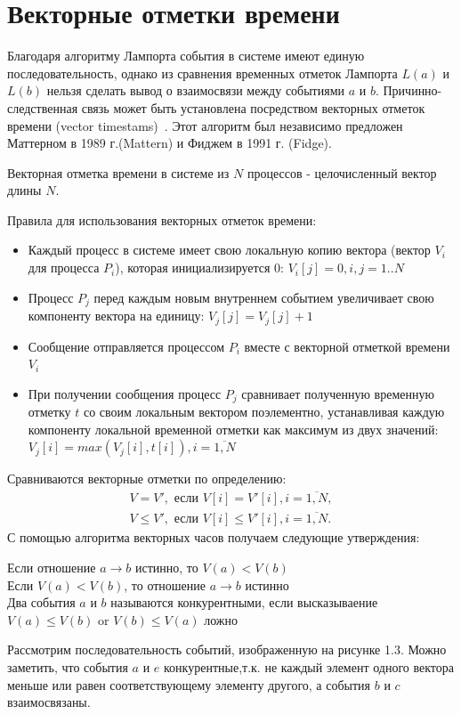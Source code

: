 \section{Векторные отметки времени} 
Благодаря алгоритму Лампорта события в системе имеют единую последовательность, однако из сравнения временных отметок Лампорта $L(a)$ и $L(b)$  нельзя сделать вывод о взаимосвязи между событиями $a$ и $b$. Причинно-следственная связь может быть установлена посредством векторных
отметок времени (vector timestams)~\cite{tanenbaum}. Этот алгоритм был независимо предложен Маттерном в 1989 г.(Mattern) и Фиджем в 1991 г. (Fidge).\par
Векторная отметка времени в системе из $N$ процессов - целочисленный вектор длины $N$.\par
Правила для использования векторных отметок времени:  
\begin{itemize}
\item Каждый процесс в системе имеет свою локальную копию вектора (вектор $V_i$ для процесса $P_i$), которая инициализируется $0$: $V_i[j] = 0, i,j = 1..N$ 
\item Процесс $P_j$ перед каждым новым внутреннем событием увеличивает свою компоненту вектора на единицу: $V_j[j] = V_j[j] + 1$
\item Сообщение отправляется процессом $P_i$ вместе с векторной отметкой времени $V_i$
\item При получении сообщения процесс $P_j$ сравнивает полученную временную отметку $t$ со своим локальным вектором поэлементно, устанавливая каждую компоненту локальной временной отметки как максимум из двух значений: $V_j[i] = max(V_j[i],t[i]), i = \overline{1,N}$
\end{itemize}
Сравниваются векторные отметки по определению: 
\begin{gather*}
  V = V', \text{ если } V[i] = V'[i], i = \overline{1,N}, \\
  V \leq V',  \text{ если } V[i] \leq V'[i], i = \overline{1,N} .
\end{gather*}
С помощью алгоритма векторных часов получаем следующие утверждения:
\begin{center}
Если отношение $a \rightarrow b$ истинно, то $V(a) < V(b)$\\
Если $V(a) < V(b)$, то отношение $a \rightarrow b$ истинно \\
Два события $a$ и $b$ называются конкурентными, если высказываение $V(a)\leq V(b)$ or $V(b)\leq V(a)$ ложно
\end{center}
Рассмотрим последовательность событий, изображенную на рисунке 1.3. Можно заметить, что события $a$ и $e$ конкурентные,т.к. не каждый элемент одного вектора меньше или равен соответствующему элементу другого, а события $b$ и $c$ взаимосвязаны. 

